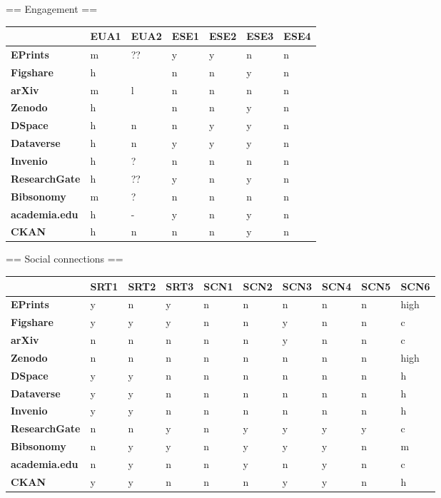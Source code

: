 == Engagement ==

\begin{tabular}{|m{2.1cm}|m{0.8cm}|m{0.8cm}|m{0.8cm}|m{0.8cm}|m{0.8cm}|m{0.8cm}|} \hline 
 & \textbf{EUA1}  & \textbf{EUA2}  & \textbf{ESE1}  & \textbf{ESE2}  & \textbf{ESE3}  & \textbf{ESE4}  \\ \hline \textbf{EPrints}  &m &?? &y &y &n &n \\ \hline 
\textbf{Figshare}  &h & &n &n &y &n \\ \hline 
\textbf{arXiv}  &m &l &n &n &n &n \\ \hline 
\textbf{Zenodo}  &h & &n &n &y &n \\ \hline 
\textbf{DSpace}  &h &n &n &y &y &n \\ \hline 
\textbf{Dataverse}  &h &n &y &y &y &n \\ \hline 
\textbf{Invenio}  &h &? &n &n &n &n \\ \hline 
\textbf{ResearchGate}  &h &?? &y &n &y &n \\ \hline 
\textbf{Bibsonomy}  &m &? &n &n &n &n \\ \hline 
\textbf{academia.edu}  &h &- &y &n &y &n \\ \hline 
\textbf{CKAN}  &h &n &n &n &y &n \\ \hline 
 \end{tabular}


== Social connections ==

\begin{tabular}{|m{2.1cm}|m{0.8cm}|m{0.8cm}|m{0.8cm}|m{0.8cm}|m{0.8cm}|m{0.8cm}|m{0.8cm}|m{0.8cm}|m{0.8cm}|} \hline 
 & \textbf{SRT1}  & \textbf{SRT2}  & \textbf{SRT3}  & \textbf{SCN1}  & \textbf{SCN2}  & \textbf{SCN3}  & \textbf{SCN4}  & \textbf{SCN5}  & \textbf{SCN6}  \\ \hline \textbf{EPrints}  &y &n &y &n &n &n &n &n &high \\ \hline 
\textbf{Figshare}  &y &y &y &n &n &y &n &n &c \\ \hline 
\textbf{arXiv}  &n &n &n &n &n &y &n &n &c \\ \hline 
\textbf{Zenodo}  &n &n &n &n &n &n &n &n &high \\ \hline 
\textbf{DSpace}  &y &y &n &n &n &n &n &n &h \\ \hline 
\textbf{Dataverse}  &y &y &n &n &n &n &n &n &h \\ \hline 
\textbf{Invenio}  &y &y &n &n &n &n &n &n &h \\ \hline 
\textbf{ResearchGate}  &n &n &y &n &y &y &y &y &c \\ \hline 
\textbf{Bibsonomy}  &n &y &y &n &y &y &y &n &m \\ \hline 
\textbf{academia.edu}  &n &y &n &n &y &n &y &n &c \\ \hline 
\textbf{CKAN}  &y &y &n &n &n &y &y &n &h \\ \hline 
 \end{tabular}


